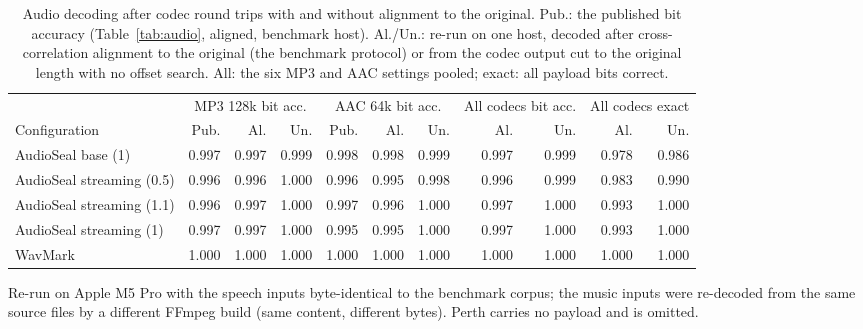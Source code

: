 \begin{table}[!t]
\centering
\footnotesize
\caption{Audio decoding after codec round trips with and without alignment to the original. Pub.: the published bit accuracy (Table~\ref{tab:audio}, aligned, benchmark host). Al./Un.: re-run on one host, decoded after cross-correlation alignment to the original (the benchmark protocol) or from the codec output cut to the original length with no offset search. All: the six MP3 and AAC settings pooled; exact: all payload bits correct.}
\label{tab:noalign}
\setlength{\tabcolsep}{3.4pt}
\begin{tabular}{lrrrrrrrrrr}
\toprule
 & \multicolumn{3}{c}{MP3 128k bit acc.} & \multicolumn{3}{c}{AAC 64k bit acc.} & \multicolumn{2}{c}{All codecs bit acc.} & \multicolumn{2}{c}{All codecs exact} \\
Configuration & Pub. & Al. & Un. & Pub. & Al. & Un. & Al. & Un. & Al. & Un. \\
\midrule
AudioSeal base (1) & 0.997 & 0.997 & 0.999 & 0.998 & 0.998 & 0.999 & 0.997 & 0.999 & 0.978 & 0.986 \\
AudioSeal streaming (0.5) & 0.996 & 0.996 & 1.000 & 0.996 & 0.995 & 0.998 & 0.996 & 0.999 & 0.983 & 0.990 \\
AudioSeal streaming (1.1) & 0.996 & 0.997 & 1.000 & 0.997 & 0.996 & 1.000 & 0.997 & 1.000 & 0.993 & 1.000 \\
AudioSeal streaming (1) & 0.997 & 0.997 & 1.000 & 0.995 & 0.995 & 1.000 & 0.997 & 1.000 & 0.993 & 1.000 \\
WavMark & 1.000 & 1.000 & 1.000 & 1.000 & 1.000 & 1.000 & 1.000 & 1.000 & 1.000 & 1.000 \\
\bottomrule
\end{tabular}
\par\vspace{2pt}\parbox{\linewidth}{\raggedright\scriptsize Re-run on Apple M5 Pro with the speech inputs byte-identical to the benchmark corpus; the music inputs were re-decoded from the same source files by a different FFmpeg build (same content, different bytes). Perth carries no payload and is omitted.}
\end{table}
